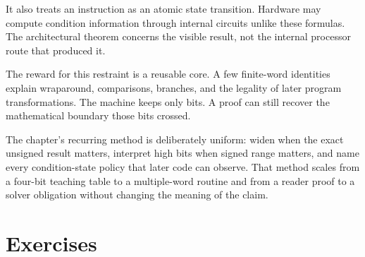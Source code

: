 It also treats an instruction as an atomic state transition. Hardware may
compute condition information through internal circuits unlike these formulas.
The architectural theorem concerns the visible result, not the internal
processor route that produced it.

The reward for this restraint is a reusable core. A few finite-word identities
explain wraparound, comparisons, branches, and the legality of later program
transformations. The machine keeps only bits. A proof can still recover the
mathematical boundary those bits crossed.

The chapter's recurring method is deliberately uniform: widen when the exact
unsigned result matters, interpret high bits when signed range matters, and
name every condition-state policy that later code can observe. That method
scales from a four-bit teaching table to a multiple-word routine and from a
reader proof to a solver obligation without changing the meaning of the claim.

\section{Exercises}

